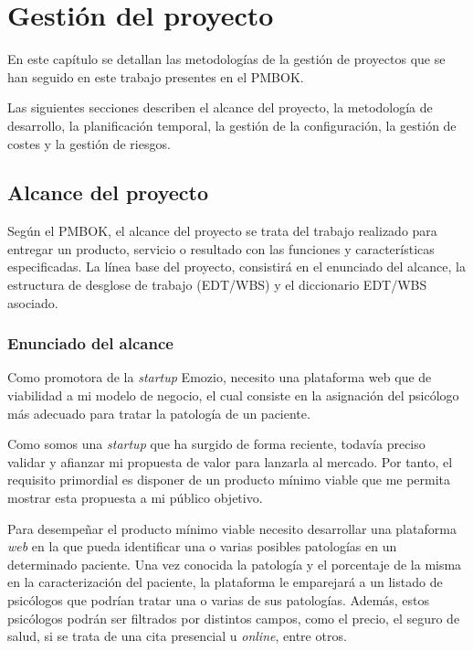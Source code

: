 \chapter{Gestión del proyecto}

En este capítulo se detallan las metodologías de la gestión de proyectos que se han seguido en este trabajo presentes en el PMBOK\cite{pmbok}.


Las siguientes secciones describen el alcance del proyecto, la metodología de desarrollo, la planificación temporal, la gestión de la configuración, la gestión de costes y la gestión de riesgos.


\section{Alcance del proyecto}

Según el PMBOK\cite{pmbok}, el alcance del proyecto se trata del trabajo realizado para entregar un producto, servicio o resultado con las funciones y características especificadas. La línea base del proyecto, consistirá en el enunciado del alcance, la estructura de desglose de trabajo (EDT/WBS) y el diccionario EDT/WBS asociado.

\subsection{Enunciado del alcance}
Como promotora de la \textit{startup} Emozio, necesito una plataforma web que de viabilidad a mi modelo de negocio, el cual consiste en la asignación del psicólogo más adecuado para tratar la patología de un paciente. 


Como somos una \textit{startup} que ha surgido de forma reciente, todavía preciso validar y afianzar mi propuesta de valor para lanzarla al mercado. Por tanto, el requisito primordial es disponer de un producto mínimo viable que me permita mostrar esta propuesta a mi público objetivo.


Para desempeñar el producto mínimo viable necesito desarrollar una plataforma \textit{web} en la que pueda identificar una o varias posibles patologías en un determinado paciente. Una vez conocida la patología y el porcentaje de la misma en la caracterización del paciente, la plataforma le emparejará a un listado de psicólogos que podrían tratar una o varias de sus  patologías. Además, estos psicólogos podrán ser filtrados por distintos campos, como el precio, el seguro de salud, si se trata de una cita presencial u \textit{online}, entre otros. 


